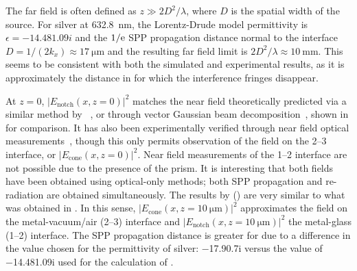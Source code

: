 The far field is often defined as $z\gg 2 D^2/\lambda$, where $D$ is the
spatial width of the source.  For silver at \SI{632.8}{\nano\meter}, the
Lorentz-Drude model permittivity is $\epsilon = \num{-14.48+1.09i}$ and the
$1/{\mathrm{e}}$ SPP propagation distance normal to the interface $D = 1/(2 k_x)
\approx \SI{17}{\micro\meter}$ and the resulting far field limit is $2
D^2/\lambda \approx \SI{10}{\milli\meter}$.  This seems to be consistent with
both the simulated and experimental results, as it is approximately the
distance in  for which the interference fringes
disappear.

At $z=0$, $|E_\text{notch}(x,z=0)|^2$ matches the near field theoretically
predicted via a similar method by ~\cite{chuang1986lateral}, or
through vector Gaussian beam decomposition~\cite{baida1999theoretical}, shown
in  for comparison.  It has also been experimentally
verified through near field optical measurements~\cite{dawson2001surface},
though this only permits observation of the field on the 2--3 interface, or
$|E_\text{cone}(x,z=0)|^2$.  Near field measurements of the 1--2 interface are
not possible due to the presence of the prism.  It is interesting that both
fields have been obtained using optical-only methods; both SPP propagation and
re-radiation are obtained simultaneously.  The results by 
() are very similar to what was obtained in
.  In this sense,
$|E_\text{cone}(x,z=\SI{10}{\micro\meter})|^2$ approximates the field on the
metal-vacuum/air (2--3) interface and
$|E_\text{notch}(x,z=\SI{10}{\micro\meter})|^2$ the metal-glass (1--2)
interface.  The SPP propagation distance is greater for  due to a
difference in the value chosen for the permittivity of silver:
\num{-17.9+0.7i} versus the value of \num{-14.48+1.09i} used for the
calculation of .

